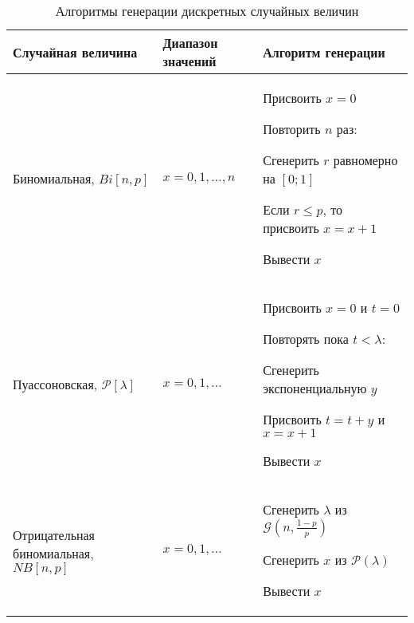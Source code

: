 \begin{table}[h]
\caption{\label{tab:pred} Алгоритмы генерации дискретных случайных величин}
\begin{tabular}{p{5cm}p{4cm}p{7cm}}
\hline
\hline 
Случайная величина & Диапазон значений & Алгоритм генерации \\
\hline
Биномиальная, $Bi[n,p]$ & $x=0,1,\ldots,n$ & Присвоить $x = 0$

Повторить $n$ раз:

\hspace{0.5cm}Сгенерить $r$ равномерно на $[0;1]$ 

\hspace{0.5cm}Если $r\leq p$, то присвоить $x = x+1$

Вывести $x$ \\

Пуассоновская, $\mathcal{P}[\lambda]$ & $x=0,1,\ldots$ & Присвоить $x = 0$ и $t = 0$

Повторять пока $t<\lambda$:

\hspace{0.5cm}Сгенерить экспоненциальную $y$  

\hspace{0.5cm}Присвоить $t=t+y$ и $x=x+1$

Вывести $x$ \\
Отрицательная биномиальная, $NB[n,p]$ & $x=0,1,\ldots$ & Сгенерить $\lambda$ из $\mathcal{G}(n,\frac{1-p}{p})$

Сгенерить $x$ из $\mathcal{P}(\lambda)$ 

Вывести $x$ \\
\hline
\hline
\end{tabular}
\end{table}


